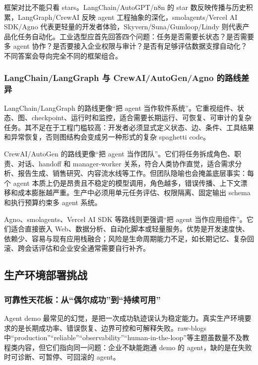 框架对比不能只看 stars。LangChain/AutoGPT/n8n 的 star 数反映传播与历史积累，LangGraph/CrewAI 反映 agent 工程抽象的深化，smolagents/Vercel AI SDK/Agno 代表更轻量的开发者体验，Skyvern/Suna/Gumloop/Lindy 则代表产品化任务自动化。工业选型应首先回答四个问题：任务是否需要长状态？是否需要多 agent 协作？是否要接入企业权限与审计？是否有足够评估数据支撑自动化？不同答案会导向完全不同的框架组合。

\subsubsection{LangChain/LangGraph 与 CrewAI/AutoGen/Agno 的路线差异}

LangChain/LangGraph 的路线更像``把 agent 当作软件系统''。它重视组件、状态、图、checkpoint、运行时和监控，适合需要长期运行、可恢复、可审计的复杂任务。其不足在于工程门槛较高：开发者必须显式定义状态、边、条件、工具结果和异常恢复，否则图结构会变成另一种形式的复杂 spaghetti code。

CrewAI/AutoGen 的路线更像``把 agent 当作团队''。它们将任务拆成角色、职责、对话、handoff 和 manager-worker 关系，符合人类协作直觉，适合需求分析、报告生成、销售研究、内容流水线等工作。但团队隐喻也会掩盖底层事实：每个 agent 本质上仍是昂贵且不稳定的模型调用，角色越多，错误传播、上下文漂移和成本膨胀越严重。生产中必须用单元任务评估、权限隔离、固定输出 schema 和执行预算约束多 agent 系统。

Agno、smolagents、Vercel AI SDK 等路线则更强调``把 agent 当作应用组件''。它们适合直接嵌入 Web、数据分析、自动化脚本或轻量服务。优势是开发速度快、依赖少、容易与现有应用栈融合；风险是生命周期能力不足，如长期记忆、复杂回滚、跨会话评估和企业安全通常需要自行补齐。

\subsection{生产环境部署挑战}\label{sec:ch6-production}

\subsubsection{可靠性天花板：从``偶尔成功''到``持续可用''}

Agent demo 最常见的幻觉，是把一次成功轨迹误认为稳定能力。真实生产环境要求的是长期成功率、错误恢复、边界可控和可解释失败。raw-blogs 中``production''``reliable''``observability''``human-in-the-loop''等主题虽数量不及教程类内容，但它们指向同一问题：企业不缺能跑通 demo 的 agent，缺的是在失败时可诊断、可暂停、可回滚的 agent。

